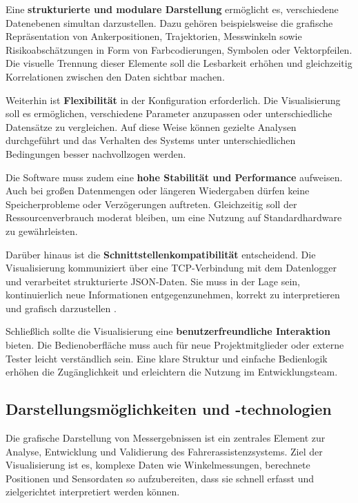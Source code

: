 \documentclass[a4paper, 12pt]{article} %
\begin{document}
Eine \textbf{strukturierte und modulare Darstellung} ermöglicht es, verschiedene Datenebenen simultan darzustellen. 
Dazu gehören beispielsweise die grafische Repräsentation von Ankerpositionen, Trajektorien, Messwinkeln sowie Risikoabschätzungen in Form von 
Farbcodierungen, Symbolen oder Vektorpfeilen. Die visuelle Trennung dieser Elemente soll die Lesbarkeit erhöhen und gleichzeitig Korrelationen zwischen 
den Daten sichtbar machen.

Weiterhin ist \textbf{Flexibilität} in der Konfiguration erforderlich. Die Visualisierung soll es ermöglichen, verschiedene Parameter 
anzupassen oder unterschiedliche Datensätze zu vergleichen. Auf diese Weise können gezielte Analysen durchgeführt und das Verhalten 
des Systems unter unterschiedlichen Bedingungen besser nachvollzogen werden.

Die Software muss zudem eine \textbf{hohe Stabilität und Performance} aufweisen. Auch bei großen Datenmengen oder längeren Wiedergaben dürfen keine 
Speicherprobleme oder Verzögerungen auftreten. Gleichzeitig soll der Ressourcenverbrauch moderat bleiben, um eine Nutzung auf Standardhardware zu 
gewährleisten.

Darüber hinaus ist die \textbf{Schnittstellenkompatibilität} entscheidend. Die Visualisierung kommuniziert über eine \ac{TCP}-Verbindung mit dem Datenlogger 
und verarbeitet strukturierte \ac{JSON}-Daten. Sie muss in der Lage sein, kontinuierlich neue Informationen entgegenzunehmen, korrekt zu interpretieren und 
grafisch darzustellen \cite{tcp_json_integration}.

Schließlich sollte die Visualisierung eine \textbf{benutzerfreundliche Interaktion} bieten. Die Bedienoberfläche muss auch für neue Projektmitglieder 
oder externe Tester leicht verständlich sein. Eine klare Struktur und einfache Bedienlogik erhöhen die Zugänglichkeit und 
erleichtern die Nutzung im Entwicklungsteam.

\subsection{Darstellungsmöglichkeiten und -technologien}

Die grafische Darstellung von Messergebnissen ist ein zentrales Element zur Analyse, Entwicklung und Validierung des Fahrerassistenzsystems.
Ziel der Visualisierung ist es, komplexe Daten wie Winkelmessungen, berechnete Positionen und Sensordaten so aufzubereiten, dass sie schnell
erfasst und zielgerichtet interpretiert werden können.
\end{document}
